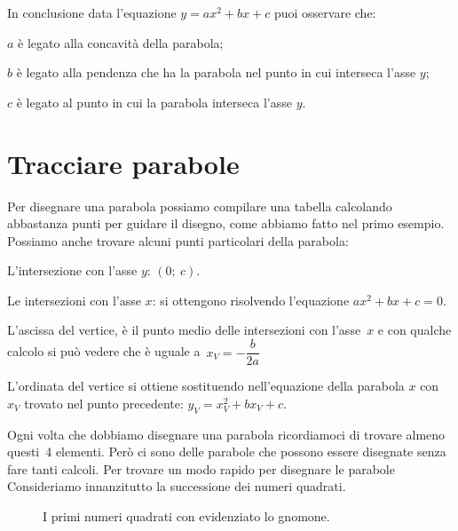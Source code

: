 In conclusione data l'equazione \(y=ax^2+bx+c\) puoi osservare che:
\begin{enumerate*}
 \item \(a\) è legato alla concavità della parabola;
 \item \(b\) è legato alla pendenza che ha la parabola nel punto in cui 
  interseca l'asse \(y\);
 \item \(c\) è legato al punto in cui la parabola interseca l'asse \(y\).
\end{enumerate*}

\section{Tracciare parabole}
\label{sec:parabola_disegno}

Per disegnare una parabola possiamo compilare una tabella calcolando 
abbastanza punti per guidare il disegno, come abbiamo fatto nel primo 
esempio.
Possiamo anche trovare alcuni punti particolari della parabola:

\begin{enumerate*}
 \item L'intersezione con l'asse \(y\): \((0;~c)\).
 \item Le intersezioni con l'asse \(x\): si ottengono risolvendo l'equazione
  \(ax^2+bx+c=0\).
 \item L'ascissa del vertice, è il punto medio delle intersezioni con 
  l'asse~\(x\) e con qualche calcolo si può vedere che è uguale 
  a~\(x_V=-\dfrac{b}{2a}\)
 \item L'ordinata del vertice si ottiene sostituendo nell'equazione della 
  parabola \(x\) con \(x_V\) trovato nel punto precedente: \(y_V=x_V^2+bx_V+c\).
\end{enumerate*}

Ogni volta che dobbiamo disegnare una parabola ricordiamoci di trovare almeno
questi~4 elementi. Però ci sono delle parabole che possono essere disegnate 
senza fare tanti calcoli. Per trovare un modo rapido per disegnare le parabole 
Consideriamo innanzitutto la successione dei numeri quadrati.

 \begin{inaccessibleblock}
\begin{figure}[h]
\begin{center} \scalebox{1.0}{\quadrati} \end{center}
  \caption{I primi numeri quadrati con evidenziato lo gnomone.}
  \label{fig:parabola_quadrati}
\end{figure}
\end{inaccessibleblock}


